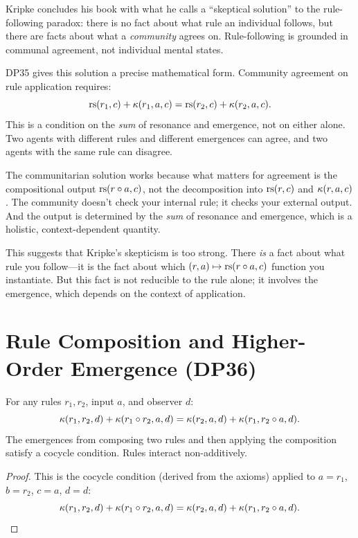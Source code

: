 \begin{interpretation}
\label{interp:kripke-communitarian}
Kripke concludes his book with what he calls a ``skeptical solution''
to the rule-following paradox: there is no fact about what rule an
individual follows, but there are facts about what a \emph{community}
agrees on.  Rule-following is grounded in communal agreement, not
individual mental states.

DP35 gives this solution a precise mathematical form.  Community
agreement on rule application requires:
\[
\mathrm{rs}(r_1, c) + \kappa(r_1, a, c) = \mathrm{rs}(r_2, c) + \kappa(r_2, a, c).
\]
This is a condition on the \emph{sum} of resonance and emergence, not
on either alone.  Two agents with different rules and different
emergences can agree, and two agents with the same rule can disagree.

The communitarian solution works because what matters for agreement
is the compositional output $\mathrm{rs}(r \circ a, c)$, not the
decomposition into $\mathrm{rs}(r, c)$ and $\kappa(r, a, c)$.  The
community doesn't check your internal rule; it checks your external
output.  And the output is determined by the \emph{sum} of resonance
and emergence, which is a holistic, context-dependent quantity.

This suggests that Kripke's skepticism is too strong.  There \emph{is}
a fact about what rule you follow---it is the fact about which
$(r, a) \mapsto \mathrm{rs}(r \circ a, c)$ function you instantiate.  But
this fact is not reducible to the rule alone; it involves the
emergence, which depends on the context of application.
\end{interpretation}

\section{Rule Composition and Higher-Order Emergence (DP36)}

\begin{theorem}
\label{thm:rule-composition-higher-order}
For any rules $r_1, r_2$, input $a$, and observer $d$:
\[
\kappa(r_1, r_2, d) + \kappa(r_1 \circ r_2, a, d) =
\kappa(r_2, a, d) + \kappa(r_1, r_2 \circ a, d).
\]
The emergences from composing two rules and then applying the composition
satisfy a cocycle condition.  Rules interact non-additively.
\end{theorem}

\begin{proof}
This is the cocycle condition (derived from the axioms) applied to
$a = r_1$, $b = r_2$, $c = a$, $d = d$:
\[
\kappa(r_1, r_2, d) + \kappa(r_1 \circ r_2, a, d) =
\kappa(r_2, a, d) + \kappa(r_1, r_2 \circ a, d).
\]
\end{proof}

